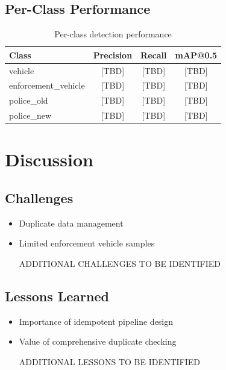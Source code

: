 \documentclass[12pt,a4paper]{article}
\begin{document}
\subsection{Per-Class Performance}

\begin{table}[H]
	\centering
	\begin{tabular}{lccc}
		\toprule
		\textbf{Class}            & \textbf{Precision} & \textbf{Recall} & \textbf{mAP@0.5} \\
		\midrule
		vehicle                 & [TBD]              & [TBD]           & [TBD]            \\
		enforcement\_vehicle    & [TBD]              & [TBD]           & [TBD]            \\
		police\_old             & [TBD]              & [TBD]           & [TBD]            \\
		police\_new             & [TBD]              & [TBD]           & [TBD]            \\
		\bottomrule
	\end{tabular}
	\caption{Per-class detection performance}
\end{table}

\section{Discussion}

\subsection{Challenges}

\begin{itemize}
	\item Duplicate data management
	\item Limited enforcement vehicle samples
	\item [ADDITIONAL CHALLENGES TO BE IDENTIFIED]
\end{itemize}

\subsection{Lessons Learned}

\begin{itemize}
	\item Importance of idempotent pipeline design
	\item Value of comprehensive duplicate checking
	\item [ADDITIONAL LESSONS TO BE IDENTIFIED]
\end{itemize}
\end{document}
